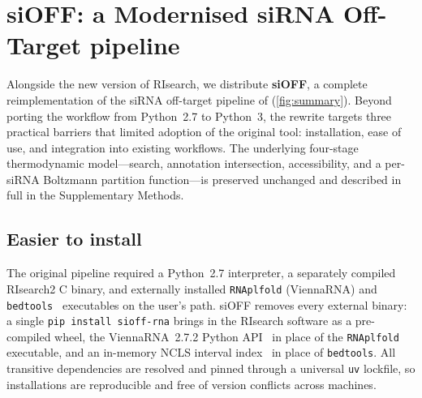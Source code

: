 \section{siOFF: a Modernised siRNA Off-Target pipeline}\label{sec:pipeline}
Alongside the new version of RIsearch, we distribute \textbf{siOFF}, a complete reimplementation of the siRNA off-target pipeline of \citet{alkan2017risearch2} (\cref{fig:summary}).
Beyond porting the workflow from Python~2.7 to Python~3, the rewrite targets three practical barriers that limited adoption of the original tool: installation, ease of use, and integration into existing workflows.
The underlying four-stage thermodynamic model---search, annotation intersection, accessibility, and a per-siRNA Boltzmann partition function---is preserved unchanged and described in full in the Supplementary Methods.

\subsection*{Easier to install}
The original pipeline required a Python~2.7 interpreter, a separately compiled RIsearch2 C binary, and externally installed \texttt{RNAplfold} (ViennaRNA) and \texttt{bedtools}~\citep{quinlan2010bedtools} executables on the user's path.
siOFF removes every external binary: a single \texttt{pip install sioff-rna} brings in the RIsearch software as a pre-compiled wheel, the ViennaRNA~2.7.2 Python API~\citep{lorenz2011vienna} in place of the \texttt{RNAplfold} executable, and an in-memory NCLS interval index~\citep{ncls} in place of \texttt{bedtools}.
All transitive dependencies are resolved and pinned through a universal \texttt{uv} lockfile, so installations are reproducible and free of version conflicts across machines.

